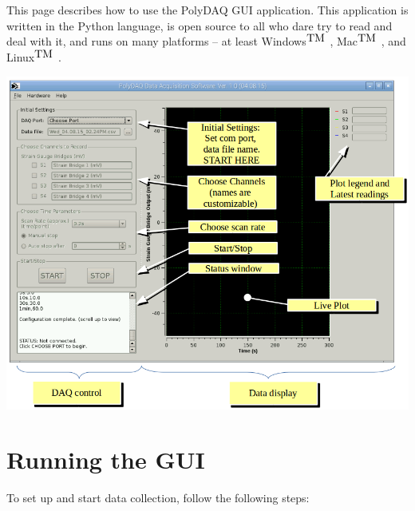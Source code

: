 This page describes how to use the Poly\-D\-A\-Q G\-U\-I application. This application is written in the Python language, is open source to all who dare try to read and deal with it, and runs on many platforms -- at least Windows$^{\mbox{T\-M}}$ , Mac$^{\mbox{T\-M}}$ , and Linux$^{\mbox{T\-M}}$ .

 
\begin{DoxyImageNoCaption}
  \mbox{\includegraphics{gui_screenshot_1.png}}
\end{DoxyImageNoCaption}
\hypertarget{pd_py_gui_gui_steps}{}\section{Running the G\-U\-I}\label{pd_py_gui_gui_steps}
To set up and start data collection, follow the following steps\-:
